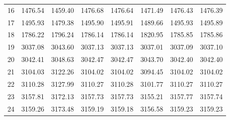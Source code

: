 \documentclass[10pt,oneside]{article}
\begin{document}
\begin{table}[h!]
\begin{tabular}{cccccccc}
16 &   1476.54 & 1459.40 & 1476.68 & 1476.64 &      1471.49 & 1476.43 & 1476.39 \\
17 &   1495.93 & 1479.38 & 1495.90 & 1495.91 &      1489.66 & 1495.93 & 1495.89 \\
18 &   1786.22 & 1796.24 & 1786.14 & 1786.14 &      1820.95 & 1785.85 & 1785.86 \\
19 &   3037.08 & 3043.60 & 3037.13 & 3037.13 &      3037.01 & 3037.09 & 3037.10 \\
20 &   3042.41 & 3048.63 & 3042.47 & 3042.47 &      3043.70 & 3042.40 & 3042.40 \\
21 &   3104.03 & 3122.26 & 3104.02 & 3104.02 &      3094.45 & 3104.02 & 3104.02 \\
22 &   3110.28 & 3127.99 & 3110.27 & 3110.28 &      3101.77 & 3110.27 & 3110.27 \\
23 &   3157.81 & 3172.13 & 3157.73 & 3157.73 &      3155.21 & 3157.77 & 3157.74 \\
24 &   3159.26 & 3173.48 & 3159.19 & 3159.18 &      3156.58 & 3159.23 & 3159.23 \\
\bottomrule
\end{tabular}
\end{table}

\clearpage
\end{document}
